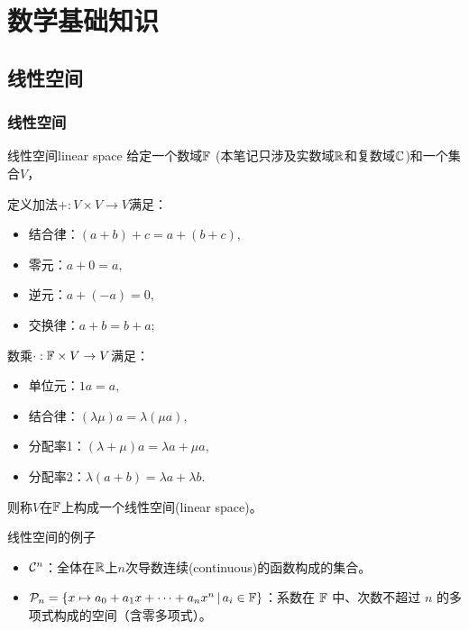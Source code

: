 \chapter{数学基础知识}
\label{chap:math basics}

\section{线性空间}
\label{sec:linear space}

\subsection{线性空间}

\begin{definition}
    {线性空间}{linear space}
    给定一个数域$\mathbb{F}$ (本笔记只涉及实数域$\mathbb{R}$和复数域$\mathbb{C}$)和一个集合$V$，
    
    定义加法$+:V \times V \to V$满足：
    \begin{itemize}
        \item 结合律：$(a + b) + c = a + (b + c),$
        \item 零元：$a + 0 = a,$
        \item 逆元：$a + (-a) = 0,$
        \item 交换律：$a + b = b + a;$
    \end{itemize}
    数乘$\cdot :\mathbb{F} \times V \to V$满足：
    \begin{itemize}
        \item 单位元：$1a = a,$
        \item 结合律：$(\lambda\mu)a = \lambda(\mu a),$
        \item 分配率1：$(\lambda + \mu)a = \lambda a + \mu a,$
        \item 分配率2：$\lambda(a + b) = \lambda a + \lambda b.$
    \end{itemize}
    则称$V$在$\mathbb{F}$上构成一个线性空间(linear space)。
\end{definition}

\begin{example}
    {线性空间的例子}{}
    \begin{itemize}
        \item $\mathcal{C}^n$：全体在$\mathbb{R}$上$n$次导数连续(continuous)的函数构成的集合。
        \item $\mathcal{P}_n = \{x \mapsto a_0 + a_1x + \cdots + a_nx^n\,\vert\,a_i \in \mathbb{F}\}$：系数在 $\mathbb{F}$ 中、次数不超过 $n$ 的多项式构成的空间（含零多项式）。
    \end{itemize}
\end{example}

